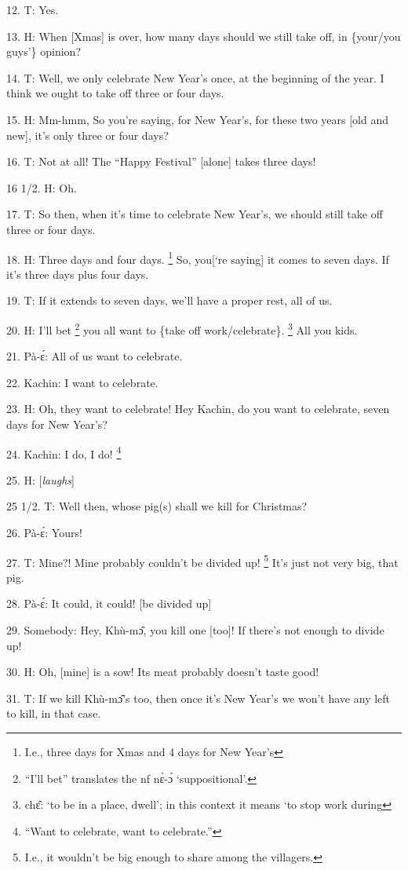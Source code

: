 12. T: Yes.

13. H: When [Xmas] is over, how many days should we still take off, in \{your/you
guys'\} opinion?

14. T: Well, we only celebrate New Year's once, at the beginning of the year.
I think we ought to take off three or four days.

15. H: Mm-hmm,  So you're saying, for New Year's, for these two years [old and
new], it's only three or four days?

16. T: Not at all!  The ``Happy Festival''  [alone] takes three days!

16 1/2. H: Oh.

17. T: So then, when it's time to celebrate New Year's, we should still take off
three or four days.

18. H: Three days and four days. \footnote{I.e., three days for Xmas and 4 days for New Year's} So, you[`re saying] it comes to seven days.
If it's three days plus four days.

19. T: If it extends to seven days, we'll have a proper rest, all of us.

20. H: I'll bet \footnote{``I'll bet'' translates the nf nɛ̀-ɔ́ `suppositional'.} you all want to \{take off work/celebrate\}. \footnote{chɛ̂: `to be in a place, dwell'; in this context it means `to stop work during}  All you kids.

21. Pà-ɛ́: All of us want to celebrate.

22. Kachin: I want to celebrate.

23. H: Oh, they want to celebrate!  Hey Kachin, do you want to celebrate, seven
days for New Year's?

24. Kachin: I do, I do! \footnote{``Want to celebrate, want to celebrate.''}

25. H: [\textit{laughs}]

25 1/2. T: Well then, whose pig(s) shall we kill for Christmas?

26. Pà-ɛ́: Yours!

27. T: Mine?!  Mine probably couldn't be divided up! \footnote{I.e., it wouldn't be big enough to share among the villagers.}  It's just not very big,
that pig.

28. Pà-ɛ́: It could, it could! [be divided up]

29. Somebody: Hey, Khù-mɔ̂, you kill one [too]!  If there's not enough to divide
up!

30. H: Oh, [mine] is a sow!  Its meat probably doesn't taste good!

31. T: If we kill Khù-mɔ̂'s too, then once it's New Year's we won't have any
left to kill, in that case.

